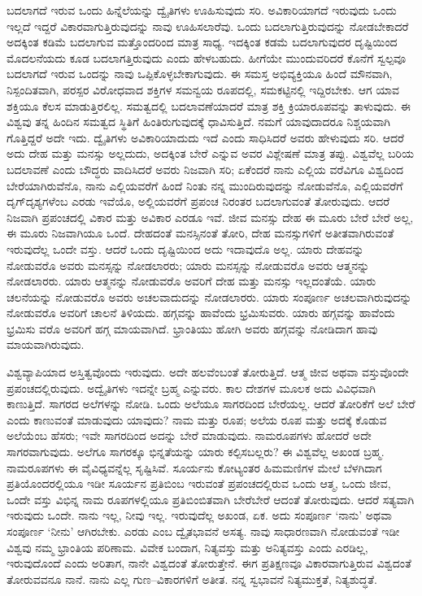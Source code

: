 ಬದಲಾಗದೆ ಇರುವ ಒಂದು ಹಿನ್ನೆಲೆಯನ್ನು ದ್ವೈತಿಗಳು ಊಹಿಸುವುದು ಸರಿ. ಅವಿಕಾರಿಯಾಗದೆ ಇರುವುದು ಒಂದು ಇಲ್ಲದೆ ಇದ್ದರೆ ವಿಕಾರವಾಗುತ್ತಿರುವುದನ್ನು ನಾವು ಊಹಿಸಲಾರೆವು. ಒಂದು ಬದಲಾಗುತ್ತಿರುವುದನ್ನು ನೋಡಬೇಕಾದರೆ ಅದಕ್ಕಿಂತ ಕಡಿಮೆ ಬದಲಾಗುವ ಮತ್ತೊಂದರಿಂದ ಮಾತ್ರ ಸಾಧ್ಯ. ಇದಕ್ಕಿಂತ ಕಡಮೆ ಬದಲಾಗುವುದರ ದೃಷ್ಟಿಯಿಂದ ಮೊದಲನೆಯದು ಕೂಡ ಬದಲಾಗತ್ತಿರುವುದು ಎಂದು ಹೇಳಬಹುದು. ಹೀಗೆಯೇ ಮುಂದುವರಿದರೆ ಕೊನೆಗೆ ಸ್ವಲ್ಪವೂ ಬದಲಾಗದೆ ಇರುವ ಒಂದನ್ನು ನಾವು ಒಪ್ಪಿಕೊಳ್ಳಬೇಕಾಗುವುದು. ಈ ಸಮಸ್ತ ಅಭಿವ್ಯಕ್ತಿಯೂ ಹಿಂದೆ ಮೌನವಾಗಿ, ನಿಸ್ಪಂದಿತವಾಗಿ, ಪರಸ್ಪರ ವಿರೋಧವಾದ ಶಕ್ತಿಗಳ ಸಮನ್ವಯ ರೂಪದಲ್ಲಿ, ಸಮಕಟ್ಟಿನಲ್ಲಿ ಇದ್ದಿರಬೇಕು. ಆಗ ಯಾವ ಶಕ್ತಿಯೂ ಕೆಲಸ ಮಾಡುತ್ತಿರಲಿಲ್ಲ. ಸಮತ್ವದಲ್ಲಿ ಬದಲಾವಣೆಯಾದರೆ ಮಾತ್ರ ಶಕ್ತಿ ಕ್ರಿಯಾರೂಪವನ್ನು ತಾಳುವುದು. ಈ ವಿಶ್ವವು ತನ್ನ ಹಿಂದಿನ ಸಮತ್ವದ ಸ್ಥಿತಿಗೆ ಹಿಂತಿರುಗುವುದಕ್ಕೆ ಧಾವಿಸುತ್ತಿದೆ. ನಮಗೆ ಯಾವುದಾದರೂ ನಿಶ್ಚಯವಾಗಿ ಗೊತ್ತಿದ್ದರೆ ಅದೇ ಇದು. ದ್ವೈತಿಗಳು ಅವಿಕಾರಿಯಾದುದು ಇದೆ ಎಂದು ಸಾಧಿಸಿದರೆ ಅವರು ಹೇಳುವುದು ಸರಿ. ಆದರೆ ಅದು ದೇಹ ಮತ್ತು ಮನಸ್ಸು ಅಲ್ಲದುದು, ಅದಕ್ಕಿಂತ ಬೇರೆ ಎನ್ನುವ ಅವರ ವಿಶ್ಲೇಷಣೆ ಮಾತ್ರ ತಪ್ಪು. ವಿಶ್ವವೆಲ್ಲ ಬರಿಯ ಬದಲಾವಣೆ ಎಂದು ಬೌದ್ಧರು ವಾದಿಸಿದರೆ ಅವರು ನಿಜವಾಗಿ ಸರಿ; ಏಕೆಂದರೆ ನಾನು ಎಲ್ಲಿಯ ವರೆವಿಗೂ ವಿಶ್ವದಿಂದ ಬೇರೆಯಾಗಿರುವೆನೊ, ನಾನು ಎಲ್ಲಿಯವರೆಗೆ ಹಿಂದೆ ನಿಂತು ನನ್ನ ಮುಂದಿರುವುದನ್ನು ನೋಡುವೆನೊ, ಎಲ್ಲಿಯವರೆಗೆ ದೃಗ್​ದೃಶ್ಯಗಳೆಂಬ ಎರಡು ಇವೆಯೊ, ಅಲ್ಲಿಯವರೆಗೆ ಪ್ರಪಂಚ ನಿರಂತರ ಬದಲಾಗುವಂತೆ ತೋರುವುದು. ಆದರೆ ನಿಜವಾಗಿ ಪ್ರಪಂಚದಲ್ಲಿ ವಿಕಾರ ಮತ್ತು ಅವಿಕಾರ ಎರಡೂ ಇವೆ. ಜೀವ ಮನಸ್ಸು ದೇಹ ಈ ಮೂರು ಬೇರೆ ಬೇರೆ ಅಲ್ಲ, ಈ ಮೂರು ನಿಜವಾಗಿಯೂ ಒಂದೆ. ದೇಹದಂತೆ ಮನಸ್ಸಿನಂತೆ ತೋರಿ, ದೇಹ ಮನಸ್ಸುಗಳಿಗೆ ಅತೀತವಾಗಿರುವಂತೆ ಇರುವುದೆಲ್ಲ ಒಂದೇ ವಸ್ತು. ಆದರೆ ಒಂದು ದೃಷ್ಟಿಯಿಂದ ಅದು ಇದಾವುದೊ ಅಲ್ಲ. ಯಾರು ದೇಹವನ್ನು ನೋಡುವರೊ ಅವರು ಮನಸ್ಸನ್ನು ನೋಡಲಾರರು; ಯಾರು ಮನಸ್ಸನ್ನು ನೋಡುವರೊ ಅವರು ಆತ್ಮನನ್ನು ನೋಡಲಾರರು. ಯಾರು ಆತ್ಮನನ್ನು ನೋಡುವರೊ ಅವರಿಗೆ ದೇಹ ಮತ್ತು ಮನಸ್ಸು ಇಲ್ಲದಂತೆಯೆ. ಯಾರು ಚಲನೆಯನ್ನು ನೋಡುವರೊ ಅವರು ಅಚಲವಾದುದನ್ನು ನೋಡಲಾರರು. ಯಾರು ಸಂಪೂರ್ಣ ಅಚಲವಾಗಿರುವುದನ್ನು ನೋಡುವರೊ ಅವರಿಗೆ ಚಾಲನೆ ತಿಳಿಯದು. ಹಗ್ಗವನ್ನು ಹಾವೆಂದು ಭ್ರಮಿಸುವರು. ಯಾರು ಹಗ್ಗವನ್ನು ಹಾವೆಂದು ಭ್ರಮಿಸು ವರೊ ಅವರಿಗೆ ಹಗ್ಗ ಮಾಯವಾಗಿದೆ. ಭ್ರಾಂತಿಯು ಹೋಗಿ ಅವರು ಹಗ್ಗವನ್ನು ನೋಡಿದಾಗ ಹಾವು ಮಾಯವಾಗಿರುವುದು.

ವಿಶ್ವವ್ಯಾಪಿಯಾದ ಅಸ್ತಿತ್ವವೊಂದು ಇರುವುದು. ಅದೇ ಹಲವೆಂಬಂತೆ ತೋರುತ್ತಿದೆ. ಆತ್ಮ ಜೀವ ಅಥವಾ ವಸ್ತುವೊಂದೇ ಪ್ರಪಂಚದಲ್ಲಿರುವುದು. ಅದ್ವೈತಿಗಳು ಇದನ್ನೇ ಬ್ರಹ್ಮ ಎನ್ನುವರು. ಕಾಲ ದೇಶಗಳ ಮೂಲಕ ಅದು ವಿವಿಧವಾಗಿ ಕಾಣುತ್ತಿದೆ. ಸಾಗರದ ಅಲೆಗಳನ್ನು ನೋಡಿ. ಒಂದು ಅಲೆಯೂ ಸಾಗರದಿಂದ ಬೇರೆಯಲ್ಲ. ಆದರೆ ತೋರಿಕೆಗೆ ಅಲೆ ಬೇರೆ ಎಂದು ಕಾಣುವಂತೆ ಮಾಡುವುದು ಯಾವುದು? ನಾಮ ಮತ್ತು ರೂಪ; ಅಲೆಯ ರೂಪ ಮತ್ತು ಅದಕ್ಕೆ ಕೊಡುವ ಅಲೆಯೆಂಬ ಹೆಸರು; ಇವೇ ಸಾಗರದಿಂದ ಅದನ್ನು ಬೇರೆ ಮಾಡುವುದು. ನಾಮರೂಪಗಳು ಹೋದರೆ ಅದೇ ಸಾಗರವಾಗುವುದು. ಅಲೆಗೂ ಸಾಗರಕ್ಕೂ ಭಿನ್ನತೆಯನ್ನು ಯಾರು ಕಲ್ಪಿಸಬಲ್ಲರು? ಈ ವಿಶ್ವವೆಲ್ಲ ಅಖಂಡ ಬ್ರಹ್ಮ. ನಾಮರೂಪಗಳು ಈ ವೈವಿಧ್ಯವನ್ನೆಲ್ಲ ಸೃಷ್ಟಿಸಿವೆ. ಸೂರ್ಯನು ಕೋಟ್ಯಂತರ ಹಿಮಮಣಿಗಳ ಮೇಲೆ ಬೆಳಗಿದಾಗ ಪ್ರತಿಯೊಂದರಲ್ಲಿಯೂ ಇಡೀ ಸೂರ್ಯನ ಪ್ರತಿಬಿಂಬ ಇರುವಂತೆ ಪ್ರಪಂಚದಲ್ಲಿರುವ ಒಂದು ಆತ್ಮ, ಒಂದು ಜೀವ, ಒಂದೇ ವಸ್ತು ವಿಭಿನ್ನ ನಾಮ ರೂಪಗಳಲ್ಲಿಯೂ ಪ್ರತಿಬಿಂಬಿತವಾಗಿ ಬೇರೆಬೇರೆ ಆದಂತೆ ತೋರುವುದು. ಆದರೆ ಸತ್ಯವಾಗಿ ಇರುವುದು ಒಂದೇ. ನಾನು ಇಲ್ಲ, ನೀವು ಇಲ್ಲ. ಇರುವುದೆಲ್ಲ ಅಖಂಡ, ಏಕ. ಅದು ಸಂಪೂರ್ಣ ‘ನಾನು’ ಅಥವಾ ಸಂಪೂರ್ಣ ‘ನೀನು’ ಆಗಿರಬೇಕು. ಎರಡು ಎಂಬ ದ್ವೈತಭಾವನೆ ಅಸತ್ಯ. ನಾವು ಸಾಧಾರಣವಾಗಿ ನೋಡುವಂತೆ ಇಡೀ ವಿಶ್ವವು ನಮ್ಮ ಭ್ರಾಂತಿಯ ಪರಿಣಾಮ. ವಿವೇಕ ಬಂದಾಗ, ನಿತ್ಯವಸ್ತು ಮತ್ತು ಅನಿತ್ಯವಸ್ತು ಎಂದು ಎರಡಿಲ್ಲ, ಇರುವುದೊಂದೆ ಎಂದು ಅರಿತಾಗ, ನಾನೇ ವಿಶ್ವದಂತೆ ತೋರುತ್ತೇನೆ. ಈಗ ಪ್ರತಿಕ್ಷಣವೂ ವಿಕಾರವಾಗುತ್ತಿರುವ ವಿಶ್ವದಂತೆ ತೋರುವವನೂ ನಾನೆ. ನಾನು ಎಲ್ಲ ಗುಣ–ವಿಕಾರಗಳಿಗೆ ಅತೀತ. ನನ್ನ ಸ್ವಭಾವನೆ ನಿತ್ಯಮುಕ್ತತೆ, ನಿತ್ಯಶುದ್ಧತೆ.

